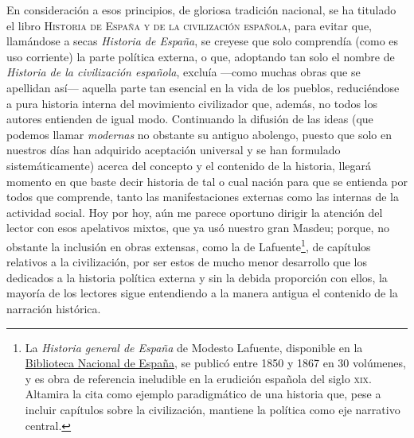 En consideración a esos principios, de gloriosa tradición nacional, se ha titulado el libro \textsc{Historia de España y de la civilización española}, para evitar que, llamándose a secas \emph{Historia de España}, se creyese que solo comprendía (como es uso corriente) la parte política externa, o que, adoptando tan solo el nombre de \emph{Historia de la civilización española}, excluía ---como muchas obras que se apellidan así--- aquella parte tan esencial en la vida de los pueblos, reduciéndose a pura historia interna del movimiento civilizador que, además, no todos los autores entienden de igual modo. Continuando la difusión de las ideas (que podemos llamar \emph{modernas} no obstante su antiguo abolengo, puesto que solo en nuestros días han adquirido aceptación universal y se han formulado sistemáticamente) acerca del concepto y el contenido de la historia, llegará momento en que baste decir historia de tal o cual nación para que se entienda por todos que comprende, tanto las manifestaciones externas como las internas de la actividad social. Hoy por hoy, aún me parece oportuno dirigir la atención del lector con esos apelativos mixtos, que ya usó nuestro gran Masdeu; porque, no obstante la inclusión en obras extensas, como la de Lafuente\footnote{La \emph{Historia general de España} de Modesto Lafuente, disponible en la \href{https://catalogo.bne.es/permalink/34BNE_INST/95vni4/alma991045007239708606}{Biblioteca Nacional de España}, se publicó entre 1850 y 1867 en 30 volúmenes, y es obra de referencia ineludible en la erudición española del siglo \textsc{xix}. Altamira la cita como ejemplo paradigmático de una historia que, pese a incluir capítulos sobre la civilización, mantiene la política como eje narrativo central.}, de capítulos relativos a la civilización, por ser estos de mucho menor desarrollo que los dedicados a la historia política externa y sin la debida proporción con ellos, la mayoría de los lectores sigue entendiendo a la manera antigua el contenido de la narración histórica.
